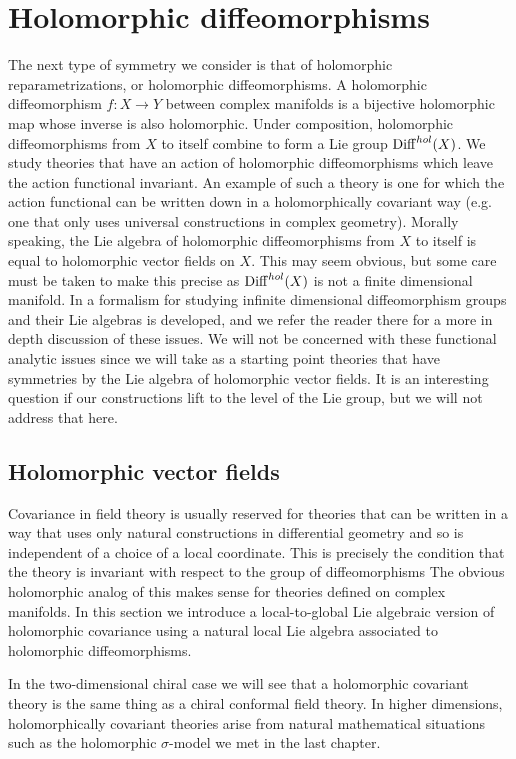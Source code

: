 \section{Holomorphic diffeomorphisms}

The next type of symmetry we consider is that of holomorphic reparametrizations, or holomorphic diffeomorphisms. 
A holomorphic diffeomorphism $f : X \to Y$ between complex manifolds is a bijective holomorphic map whose inverse is also holomorphic.
Under composition, holomorphic diffeomorphisms from $X$ to itself combine to form a Lie group ${\rm Diff}^{hol}(X)$.
We study theories that have an action of holomorphic diffeomorphisms which leave the action functional invariant.
An example of such a theory is one for which the action functional can be written down in a holomorphically covariant way (e.g. one that only uses universal constructions in complex geometry). 
Morally speaking, the Lie algebra of holomorphic diffeomorphisms from $X$ to itself is equal to holomorphic vector fields on $X$.
This may seem obvious, but some care must be taken to make this precise as ${\rm Diff}^{hol}(X)$ is not a finite dimensional manifold.
In \cite{KM} a formalism for studying infinite dimensional diffeomorphism groups and their Lie algebras is developed, and we refer the reader there for a more in depth discussion of these issues.
We will not be concerned with these functional analytic issues since we will take as a starting point theories that have symmetries by the Lie algebra of holomorphic vector fields. 
It is an interesting question if our constructions lift to the level of the Lie group, but we will not address that here.

\subsection{Holomorphic vector fields}

Covariance in field theory is usually reserved for theories that can be written in a way that uses only natural constructions in differential geometry and so is independent of a choice of a local coordinate. 
This is precisely the condition that the theory is invariant with respect to the group of diffeomorphisms
The obvious holomorphic analog of this makes sense for theories defined on complex manifolds. 
In this section we introduce a local-to-global Lie algebraic version of holomorphic covariance using a natural local Lie algebra associated to holomorphic diffeomorphisms.

In the two-dimensional chiral case we will see that a holomorphic covariant theory is the same thing as a chiral conformal field theory.
In higher dimensions, holomorphically covariant theories arise from natural mathematical situations such as the holomorphic $\sigma$-model we met in the last chapter.

